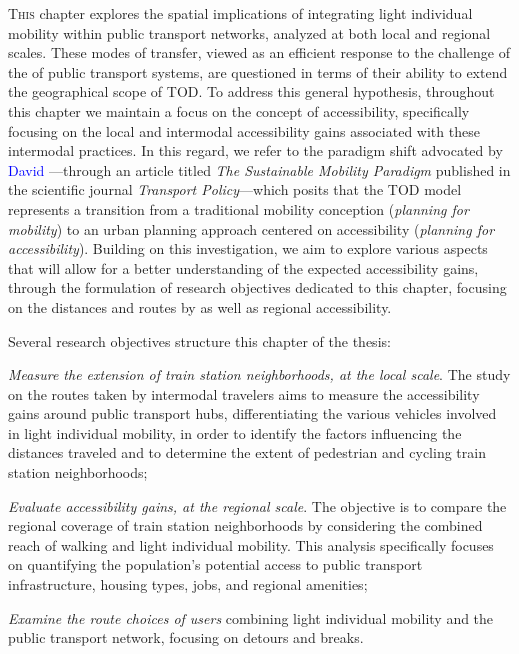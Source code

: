 \begin{refsegment}
\lettrine[lines=3, findent=8pt, nindent=0pt]{ T}{his} chapter explores the spatial implications of integrating light individual mobility within public transport networks, analyzed at both local and regional scales. These modes of transfer, viewed as an efficient response to the challenge of the  of public transport systems, are questioned in terms of their ability to extend the geographical scope of \acrfull{TOD}. To address this general hypothesis, throughout this chapter we maintain a focus on the concept of \gls{accessibility}, specifically focusing on the local and intermodal accessibility gains associated with these intermodal practices. In this regard, we refer to the paradigm shift advocated by \textcolor{blue}{David} \textcolor{blue}{\textcite[75]{banister_sustainable_2008}}—through an article titled \textsl{The Sustainable Mobility Paradigm} published in the scientific journal \textsl{Transport Policy}—which posits that the \acrshort{TOD} model represents a transition from a traditional mobility conception (\textsl{planning for mobility}) to an urban planning approach centered on accessibility (\textsl{planning for accessibility}). Building on this investigation, we aim to explore various aspects that will allow for a better understanding of the expected accessibility gains, through the formulation of research objectives dedicated to this chapter, focusing on the distances and routes  by  \textcolor{blue}{\autocite[347]{lussault_homme_2007}} as well as regional accessibility.%

Several research objectives structure this chapter of the thesis:
\begin{customitemize}
    \item \textsl{Measure the extension of train station neighborhoods, at the local scale}. The study on the routes taken by intermodal travelers aims to measure the accessibility gains around public transport hubs, differentiating the various vehicles involved in light individual mobility, in order to identify the factors influencing the distances traveled and to determine the extent of pedestrian and cycling train station neighborhoods;
    \item \textsl{Evaluate accessibility gains, at the regional scale}. The objective is to compare the regional coverage of train station neighborhoods by considering the combined reach of walking and light individual mobility. This analysis specifically focuses on quantifying the population's potential access to public transport infrastructure, housing types, jobs, and regional amenities;
    \item \textsl{Examine the route choices of users} combining light individual mobility and the public transport network, focusing on detours and breaks.
\end{customitemize}%


\end{refsegment}
